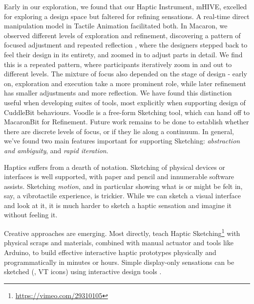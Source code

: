 Early in our exploration, we found that our Haptic Instrument, mHIVE, excelled for exploring a design space but faltered for refining sensations.
A real-time direct manipulation model in Tactile Animation facilitated both.
In Macaron, we observed different levels of exploration and refinement, discovering a pattern of focused adjustment and repeated reflection \cite{Schon1982}, where the designers stepped back to feel their design in its entirety, and zoomed in to adjust parts in detail.
We find this is a repeated pattern, where participants iteratively zoom in and out to different levels.
The mixture of focus also depended on the stage of design - early on, exploration and execution take a more prominent role, while later refinement has smaller adjustments and more reflection.
We have found this distinction useful when developing suites of tools, most explicitly when supporting design of CuddleBit behaviours.
Voodle is a free-form Sketching tool, which can hand off to MacaronBit for Refinement.
Future work remains to be done to establish whether there are discrete levels of focus, or if they lie along a continuum.
In general, we've found two main features important for supporting Sketching: \textit{abstraction and ambiguity}, and \textit{rapid iteration}.


%


	Haptics suffers from a dearth of notation.
	Sketching of physical devices or interfaces is well supported, with paper and pencil and innumerable software assists.
	Sketching \textit{motion}, and in particular showing what is or might be felt in, say, a vibrotactile experience, is  trickier.
	While we can sketch a visual interface and look at it, it is much harder to sketch a haptic sensation and imagine it without feeling it.

Creative approaches are emerging.
Most directly, \citet{Moussette2011} teach Haptic Sketching\footnote{\url{https://vimeo.com/29310105}} with physical scraps and materials, combined with manual actuator and tools like Arduino, to build effective interactive haptic prototypes physically and programmatically  in minutes or hours.
Simple display-only sensations can be sketched (\eg, VT icons)  using interactive design tools \cite{schneider2014improvising,Hong2013}.

